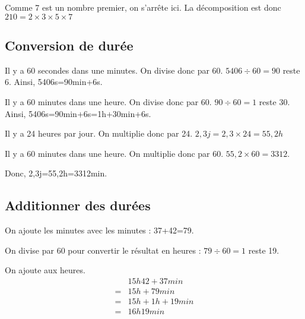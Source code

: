 Comme 7 est un nombre premier, on s'arrête ici. La décomposition est donc $210=2 \times3 \times5 \times7$

\subsection{Conversion de durée}
\begin{minipage}[t]{0.45\textwidth}
	
	Il y a 60 secondes dans une minutes. On divise donc par 60. $5406\div60=90$ reste 6. Ainsi, 5406s=90min+6s.

	Il y a 60 minutes dans une heure. On divise donc par 60. $90\div60=1$ reste 30. Ainsi, 5406s=90min+6s=1h+30min+6s.
\end{minipage}
\hfil
\vrule
\hfil
\begin{minipage}[t]{0.45\textwidth}

	Il y a 24 heures par jour. On multiplie donc par 24. $2,3j=2,3 \times24=55,2h$

	Il y a 60 minutes dans une heure. On multiplie donc par 60. $55,2 \times60=3312$.

	Donc, 2,3j=55,2h=3312min.
\end{minipage}

\subsection{Additionner des durées}

On ajoute les minutes avec les minutes : 37+42=79.

On divise par 60 pour convertir le résultat en heures : $79\div60=1$ reste 19.

On ajoute aux heures.
\begin{align*}
	&15h42+37min\\
	=&15h+79min\\
	=&15h+1h+19min\\
	=&16h19min
\end{align*}


